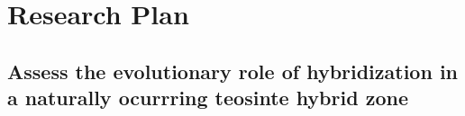 \section*{Research Plan}




\subsection{Assess the evolutionary role of hybridization in a naturally ocurrring teosinte hybrid zone}
\label{ss:hybrids}

